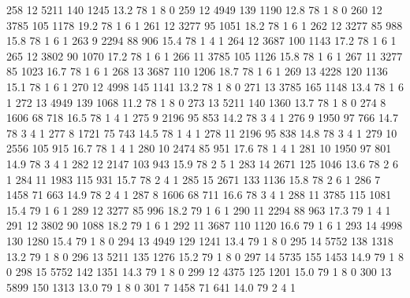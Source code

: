\documentclass{article}
\begin{document}
\begin{Schunk}
\begin{Soutput}
258      12  5211 140 1245 13.2  78      1       8        0
259      12  4949 139 1190 12.8  78      1       8        0
260      12  3785 105 1178 19.2  78      1       6        1
261      12  3277  95 1051 18.2  78      1       6        1
262      12  3277  85  988 15.8  78      1       6        1
263       9  2294  88  906 15.4  78      1       4        1
264      12  3687 100 1143 17.2  78      1       6        1
265      12  3802  90 1070 17.2  78      1       6        1
266      11  3785 105 1126 15.8  78      1       6        1
267      11  3277  85 1023 16.7  78      1       6        1
268      13  3687 110 1206 18.7  78      1       6        1
269      13  4228 120 1136 15.1  78      1       6        1
270      12  4998 145 1141 13.2  78      1       8        0
271      13  3785 165 1148 13.4  78      1       6        1
272      13  4949 139 1068 11.2  78      1       8        0
273      13  5211 140 1360 13.7  78      1       8        0
274       8  1606  68  718 16.5  78      1       4        1
275       9  2196  95  853 14.2  78      3       4        1
276       9  1950  97  766 14.7  78      3       4        1
277       8  1721  75  743 14.5  78      1       4        1
278      11  2196  95  838 14.8  78      3       4        1
279      10  2556 105  915 16.7  78      1       4        1
280      10  2474  85  951 17.6  78      1       4        1
281      10  1950  97  801 14.9  78      3       4        1
282      12  2147 103  943 15.9  78      2       5        1
283      14  2671 125 1046 13.6  78      2       6        1
284      11  1983 115  931 15.7  78      2       4        1
285      15  2671 133 1136 15.8  78      2       6        1
286       7  1458  71  663 14.9  78      2       4        1
287       8  1606  68  711 16.6  78      3       4        1
288      11  3785 115 1081 15.4  79      1       6        1
289      12  3277  85  996 18.2  79      1       6        1
290      11  2294  88  963 17.3  79      1       4        1
291      12  3802  90 1088 18.2  79      1       6        1
292      11  3687 110 1120 16.6  79      1       6        1
293      14  4998 130 1280 15.4  79      1       8        0
294      13  4949 129 1241 13.4  79      1       8        0
295      14  5752 138 1318 13.2  79      1       8        0
296      13  5211 135 1276 15.2  79      1       8        0
297      14  5735 155 1453 14.9  79      1       8        0
298      15  5752 142 1351 14.3  79      1       8        0
299      12  4375 125 1201 15.0  79      1       8        0
300      13  5899 150 1313 13.0  79      1       8        0
301       7  1458  71  641 14.0  79      2       4        1

\end{Soutput}
\end{Schunk}
\end{document}
